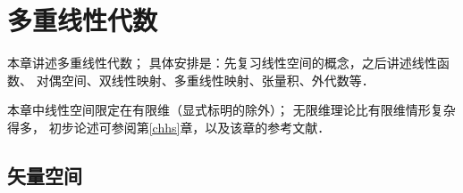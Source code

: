 
\chapter{多重线性代数}\label{chmla} %


本章讲述多重线性代数；
具体安排是：先复习线性空间的概念，之后讲述线性函数、
对偶空间、双线性映射、多重线性映射、张量积、外代数等．

本章中线性空间限定在有限维（显式标明的除外）；
无限维理论比有限维情形复杂得多，
初步论述可参阅第\ref{chhs}章，以及该章的参考文献．





\section{矢量空间}\label{chmla:sec_linear-space}

  

